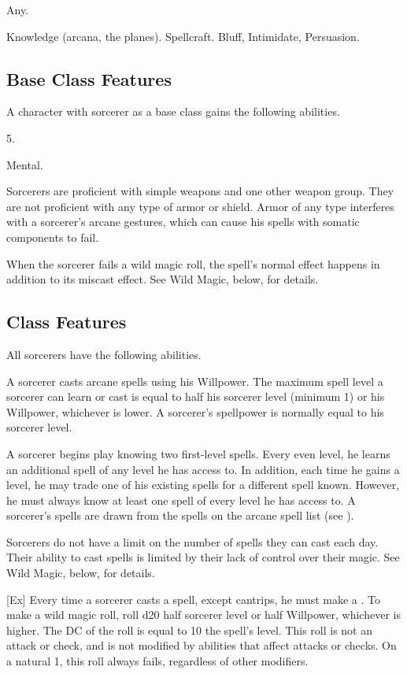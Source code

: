  Any.

 Knowledge (arcana, the planes).
 Spellcraft.
 Bluff, Intimidate, Persuasion.

\subsection{Base Class Features}
A character with sorcerer as a base class gains the following abilities.

 5.

  Mental.

Sorcerers are proficient with simple weapons  and one other weapon group.
They are not proficient with any type of armor or shield.
Armor of any type interferes with a sorcerer's arcane gestures, which can cause his spells with somatic components to fail.

When the sorcerer fails a wild magic roll, the spell's normal effect happens in addition to its miscast effect.
See Wild Magic, below, for details.

\subsection{Class Features}
All sorcerers have the following abilities.

A sorcerer casts arcane spells using his Willpower.
The maximum spell level a sorcerer can learn or cast is equal to half his sorcerer level (minimum 1) or his Willpower, whichever is lower.
A sorcerer's spellpower is normally equal to his sorcerer level.

A sorcerer begins play knowing two first-level spells.
Every even level, he learns an additional spell of any level he has access to.
In addition, each time he gains a level, he may trade one of his existing spells for a different spell known.
However, he must always know at least one spell of every level he has access to.
A sorcerer's spells are drawn from the spells on the arcane spell list (see ).

Sorcerers do not have a limit on the number of spells they can cast each day.
Their ability to cast spells is limited by their lack of control over their magic.
See Wild Magic, below, for details.

[Ex]\label{Wild Magic}
Every time a sorcerer casts a spell, except cantrips, he must make a .
To make a wild magic roll, roll d20 \add half sorcerer level or half Willpower, whichever is higher.
The DC of the roll is equal to 10 \add the spell's level.
This roll is not an attack or check, and is not modified by abilities that affect attacks or checks.
On a natural 1, this roll always fails, regardless of other modifiers.

